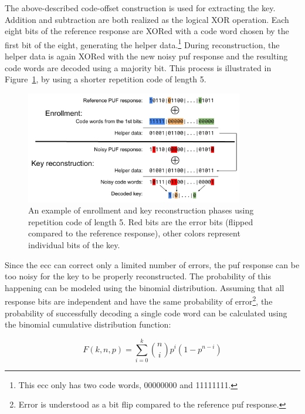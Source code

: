 The above-described code-offset construction is used for extracting the key. Addition and subtraction are both realized as the logical XOR operation. Each eight bits of the reference response are XORed with a code word chosen by the first bit of the eight, generating the helper data.\footnote{This \gls{ecc} only has two code words, 00000000 and 11111111.} During reconstruction, the helper data is again XORed with the new noisy \gls{puf} response and the resulting code words are decoded using a majority bit. This process is illustrated in Figure~\ref{fig:ecc_diagram}, by using a shorter repetition code of length 5.

\begin{figure}[ht!]
    \centering
    \captionsetup{margin=0.5cm}
    \includegraphics[width=0.85\textwidth]{images/ecc_diagram.pdf}
    \caption[An example of enrollment and key reconstruction phases using repetition code of length 5.]{An example of enrollment and key reconstruction phases using repetition code of length 5. Red bits are the error bits (flipped compared to the reference response), other colors represent individual bits of the key.\cite{Kodytek2017}}
    \label{fig:ecc_diagram}
\end{figure}

Since the \gls{ecc} can correct only a limited number of errors, the \gls{puf} response can be too noisy for the key to be properly reconstructed. The probability of this happening can be modeled using the binomial distribution. Assuming that all response bits are independent and have the same probability of error\footnote{Error is understood as a bit flip compared to the reference \gls{puf} response.}, the probability of successfully decoding a single code word can be calculated using the binomial cumulative distribution function:\cite{Iluminada2015}\cite{Christoph2008}

\begin{equation}\label{eq:binomial_cdf}
    F(k, n, p) = \sum_{i=0}^{k}\binom{n}{i}p^{i}(1-p^{n-i})
\end{equation}

